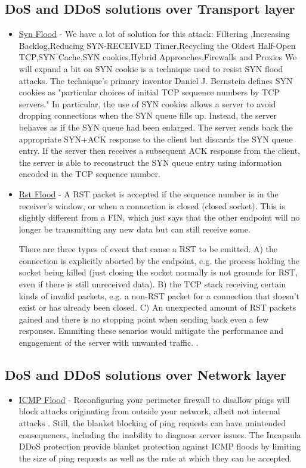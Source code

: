\documentclass{report}
\begin{document}
\subsection {DoS and DDoS solutions over Transport layer} 
\begin{itemize}
\item\underline{Syn Flood} - We have a lot of solution \cite{SynSolution} for this attack:
Filtering ,Increasing Backlog,Reducing SYN-RECEIVED Timer,Recycling the Oldest Half-Open TCP,SYN Cache,SYN cookies,Hybrid Approaches,Firewalls and Proxies
We will expand a bit on SYN cookie is a technique used to resist SYN flood attacks. The technique's primary inventor Daniel J. Bernstein defines SYN cookies as "particular choices of initial TCP sequence numbers by TCP servers." In particular, the use of SYN cookies allows a server to avoid dropping connections when the SYN queue fills up. Instead, the server behaves as if the SYN queue had been enlarged. The server sends back the appropriate SYN+ACK response to the client but discards the SYN queue entry. If the server then receives a subsequent ACK response from the client, the server is able to reconstruct the SYN queue entry using information encoded in the TCP sequence number.

\item\underline {Rst Flood} - A RST packet is accepted if the sequence number is in the receiver's window, or when a connection is closed (closed socket). This is slightly different from a FIN, which just says that the other endpoint will no longer be transmitting any new data but can still receive some.

There are three types of event that cause a RST to be emitted. A) the connection is explicitly aborted by the endpoint, e.g. the process holding the socket being killed (just closing the socket normally is not grounds for RST, even if there is still unreceived data). B) the TCP stack receiving certain kinds of invalid packets, e.g. a non-RST packet for a connection that doesn't exist or has already been closed. C) An unexpected amount of RST packets gained and there is no stopping point when sending back even a few responses.
Emmiting these senarios would mitigate the performance and engagement of the server with unwanted traffic. \cite{RstSolution}.
\end{itemize}

\subsection {DoS and DDoS solutions over Network layer} 
\begin{itemize}
\item\underline {ICMP Flood} - Reconfiguring your perimeter firewall to disallow pings will block attacks originating from outside your network, albeit not internal attacks \cite{ICMPSolution}. Still, the blanket blocking of ping requests can have unintended consequences, including the inability to diagnose server issues.
The Incapsula DDoS protection provide blanket protection against ICMP floods by limiting the size of ping requests as well as the rate at which they can be accepted.
\end{itemize}
 \hfill \break
\end{document}
